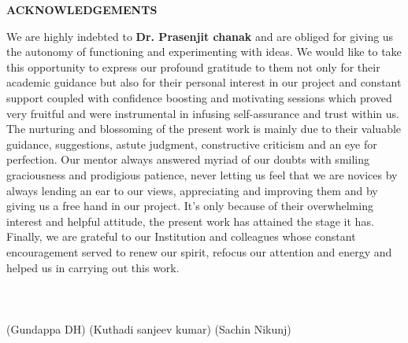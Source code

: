 
\newpage
\begin{center}
{\large \bf ACKNOWLEDGEMENTS}
\end{center}
We are highly indebted to {\bf Dr. Prasenjit chanak}  and are obliged for giving us the autonomy of functioning and experimenting with ideas. We would like to take this opportunity to express our profound gratitude to them
not only for their academic guidance but also for their personal interest in our project and constant support coupled with
confidence boosting and motivating sessions which proved very fruitful and were instrumental in infusing self-assurance
and trust within us. The nurturing and blossoming of the present work is mainly due to their valuable guidance,
suggestions, astute judgment, constructive criticism and an eye for perfection. Our mentor always answered myriad of our
doubts with smiling graciousness and prodigious patience, never letting us feel that we are novices by always lending an
ear to our views, appreciating and improving them and by giving us a free hand in our project. It's only
because of their overwhelming interest and helpful attitude, the present work has attained the stage it has. \\
Finally, we are grateful to our Institution and colleagues whose constant encouragement served to renew our spirit,
refocus our attention and energy and helped us in carrying out this work.\\ \\ \\ \\
(Gundappa DH) \hspace{1in} (Kuthadi sanjeev kumar) \hspace{1in} (Sachin Nikunj)
